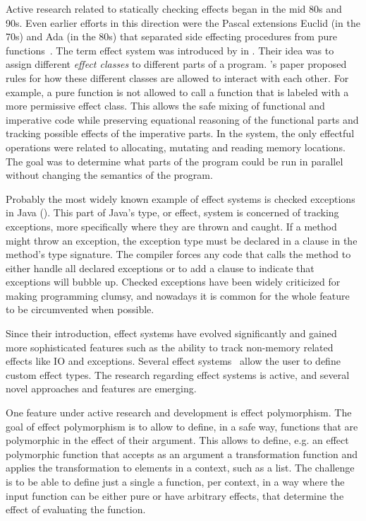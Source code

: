 Active research related to statically checking effects began in the mid 80s and 90s. Even earlier efforts in this direction were the Pascal extensions Euclid (in the 70s) and Ada (in the 80s) that separated side effecting procedures from pure functions~\cite{real-prog-in-fp}. The term effect system was introduced by \textcite{intgr-fp-ip} in \citeyear{intgr-fp-ip}. Their idea was to assign different \emph{effect classes} to different parts of a program. \citeauthor{intgr-fp-ip}'s paper proposed rules for how these different classes are allowed to interact with each other. For example, a pure function is not allowed to call a function that is labeled with a more permissive effect class. This allows the safe mixing of functional and imperative code while preserving equational reasoning of the functional parts and tracking possible effects of the imperative parts. In the system, the only effectful operations were related to allocating, mutating and reading memory locations. The goal was to determine what parts of the program could be run in parallel without changing the semantics of the program.

Probably the most widely known example of effect systems is checked exceptions in Java (). This part of Java's type, or effect, system is concerned of tracking exceptions, more specifically where they are thrown and caught. If a method might throw an exception, the exception type must be declared in a  clause in the method's type signature. The compiler forces any code that calls the method to either handle all declared exceptions or to add a  clause to indicate that exceptions will bubble up. Checked exceptions have been widely criticized for making programming clumsy, and nowadays it is common for the whole feature to be circumvented when possible.



Since their introduction, effect systems have evolved significantly and gained more sophisticated features such as the ability to track non-memory related effects like IO and exceptions. Several effect systems~\cite{koka-lang, frank-lang, unison-lang, ocaml-lang} allow the user to define custom effect types. The research regarding effect systems is active, and several novel approaches and features are emerging.

One feature under active research and development is effect polymorphism. The goal of effect polymorphism is to allow to define, in a safe way, functions that are polymorphic in the effect of their argument. This allows to define, e.g. an effect polymorphic  function that accepts as an argument a transformation function and applies the transformation to elements in a context, such as a list. The challenge is to be able to define just a single a  function, per context, in a way where the input function can be either pure or have arbitrary effects, that determine the effect of evaluating the  function.

